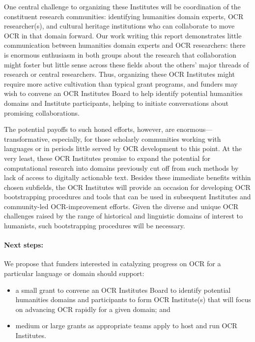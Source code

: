 \documentclass[twoside,11pt]{report}
\begin{document}
One central challenge to organizing these Institutes will be coordination of the constituent research communities: identifying humanities domain experts, OCR researcher(s), and cultural heritage institutions who can collaborate to move OCR in that domain forward. Our work writing this report demonstrates little communication between humanities domain experts and OCR researchers: there is enormous enthusiasm in both groups about the research that collaboration might foster but little sense across these fields about the others' major threads of research or central researchers. Thus, organizing these OCR Institutes might require more active cultivation than typical grant programs, and funders may wish to convene an OCR Institutes Board to help identify potential humanities domains and Institute participants, helping to initiate conversations about promising collaborations.

The potential payoffs to such honed efforts, however, are enormous---transformative, especially, for those scholarly communities working with languages or in periods little served by OCR development to this point. At the very least, these OCR Institutes promise to expand the potential for computational research into domains previously cut off from such methods by lack of access to digitally actionable text. Besides these immediate benefits within chosen subfields, the OCR Institutes will provide an occasion for developing OCR bootstrapping procedures and tools that can be used in subsequent Institutes and community-led OCR-improvement efforts. Given the diverse and unique OCR challenges raised by the range of historical and linguistic domains of interest to humanists, such bootstrapping procedures will be necessary.

\paragraph{Next steps:} We propose that funders interested in catalyzing progress on OCR for a particular language or domain should support:
\begin{itemize}

\item a small grant to convene an OCR Institutes Board to identify potential humanities domains and participants to form OCR Institute(s) that will focus on advancing OCR rapidly for a given domain; and

\item medium or large grants as appropriate teams apply to host and run OCR Institutes.

\end{itemize}
\end{document}
